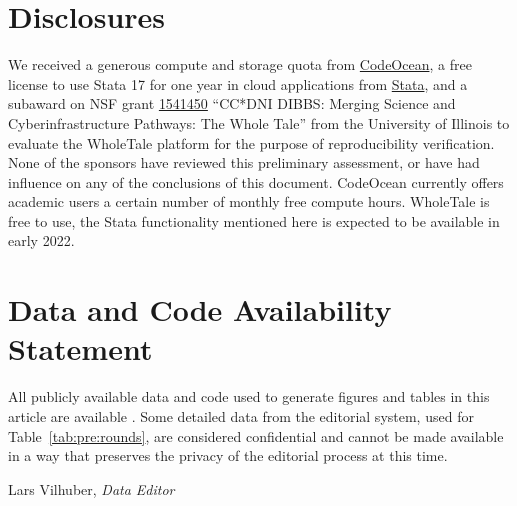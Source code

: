 \documentclass[PP]{AEA}
\begin{document}
\section{Disclosures}
\label{sec:disclosure}

We received a generous compute and storage quota from \href{https://codeocean.com/}{CodeOcean}, a free license to use Stata 17 for one year in cloud applications from \href{https://stata.com/}{Stata}, and a subaward on NSF grant \href{https://nsf.gov/awardsearch/showAward?AWD_ID=1541450&HistoricalAwards=false}{1541450} ``CC*DNI DIBBS: Merging Science and Cyberinfrastructure Pathways: The Whole Tale'' from the University of Illinois to evaluate the WholeTale platform for the purpose of reproducibility verification. None of the sponsors have reviewed this preliminary assessment, or have had influence on any of the conclusions of this document. CodeOcean currently offers academic users a certain number of monthly free compute hours. WholeTale is free to use,  the Stata  functionality mentioned here is expected to be available in early 2022.


\section{Data and Code Availability Statement}
\label{sec:dcas}

All publicly available data and code used to generate figures and tables in this article are available \citep{report2021data,E117876V3}. Some detailed data from the editorial system, used for Table~\ref{tab:pre:rounds}, are considered confidential and cannot be made available in a way that preserves the privacy of the editorial process at this time.

\begin{flushright}
{\sc Lars Vilhuber}, \textit{Data Editor}
\end{flushright}


\FloatBarrier
%
%



\appendix

%
\end{document}
